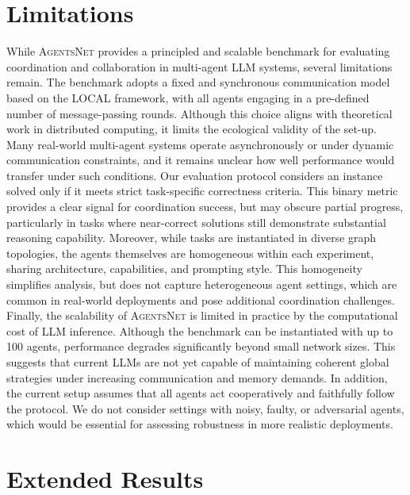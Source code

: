 \documentclass{article}
\newcommand{\benchmark}{\textsc{AgentsNet}}
\begin{document}
\section{Limitations}\label{app:limitations}
While \benchmark{} provides a principled and scalable benchmark for evaluating coordination and collaboration in multi-agent LLM systems, several limitations remain. 
The benchmark adopts a fixed and synchronous communication model based on the LOCAL framework, with all agents engaging in a pre-defined number of message-passing rounds. Although this choice aligns with theoretical work in distributed computing, it limits the ecological validity of the set-up. Many real-world multi-agent systems operate asynchronously or under dynamic communication constraints, and it remains unclear how well performance would transfer under such conditions.
Our evaluation protocol considers an instance solved only if it meets strict task-specific correctness criteria. This binary metric provides a clear signal for coordination success, but may obscure partial progress, particularly in tasks where near-correct solutions still demonstrate substantial reasoning capability. Moreover, while tasks are instantiated in diverse graph topologies, the agents themselves are homogeneous within each experiment, sharing architecture, capabilities, and prompting style. This homogeneity simplifies analysis, but does not capture heterogeneous agent settings, which are common in real-world deployments and pose additional coordination challenges.
Finally, the scalability of \benchmark{} is limited in practice by the computational cost of LLM inference. Although the benchmark can be instantiated with up to 100 agents, performance degrades significantly beyond small network sizes. This suggests that current LLMs are not yet capable of maintaining coherent global strategies under increasing communication and memory demands. In addition, the current setup assumes that all agents act cooperatively and faithfully follow the protocol. We do not consider settings with noisy, faulty, or adversarial agents, which would be essential for assessing robustness in more realistic deployments.

\section{Extended Results}\label{app:extended_results}
\end{document}
